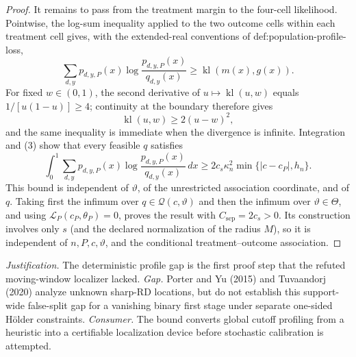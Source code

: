 \documentclass{article}
\begin{document}
\begin{proof}
It remains to pass from the treatment margin to the four-cell likelihood.  Pointwise, the log-sum inequality applied to the two outcome cells within each treatment cell gives, with the extended-real conventions of def:population-profile-loss,
\[
 \sum_{d,y}p_{d,y,P}(x)\log\frac{p_{d,y,P}(x)}{q_{d,y}(x)}
 \ge \operatorname{kl}(m(x),g(x)).
\]
For fixed \(w\in(0,1)\), the second derivative of \(u\mapsto\operatorname{kl}(u,w)\) equals \(1/[u(1-u)]\ge4\); continuity at the boundary therefore gives
\[
 \operatorname{kl}(u,w)\ge2(u-w)^2,
\]
and the same inequality is immediate when the divergence is infinite.  Integration and (3) show that every feasible \(q\) satisfies
\[
 \int_0^1\sum_{d,y}p_{d,y,P}(x)
       \log\frac{p_{d,y,P}(x)}{q_{d,y}(x)}\,dx
 \ge2c_s\kappa_n^2\min\{|c-c_P|,h_n\}.
\]
This bound is independent of \(\vartheta\), of the unrestricted association coordinate, and of \(q\).  Taking first the infimum over \(q\in\mathcal Q(c,\vartheta)\) and then the infimum over \(\vartheta\in\Theta\), and using \(\mathcal L_P(c_P,\theta_P)=0\), proves the result with \(C_{\mathrm{sep}}=2c_s>0\).  Its construction involves only \(s\) (and the declared normalization of the radius \(M\)), so it is independent of \(n,P,c,\vartheta\), and the conditional treatment--outcome association.
\end{proof}
\par\smallskip\noindent \textit{Justification.} The deterministic profile gap is the first proof step that the refuted moving-window localizer lacked. \textit{Gap.} Porter and Yu (2015) and Tuvaandorj (2020) analyze unknown sharp-RD locations, but do not establish this support-wide false-split gap for a vanishing binary first stage under separate one-sided H\"older constraints. \textit{Consumer.} The bound converts global cutoff profiling from a heuristic into a certifiable localization device before stochastic calibration is attempted.
\end{document}

